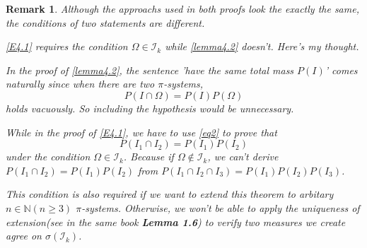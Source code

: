 \documentclass{article}
\newtheorem{remark}[theorem]{Remark}
\newcommand{\mbn}{\mathbb{N}}
\newcommand{\mci}{\mathcal{I}}
\begin{document}
\begin{remark}
    Although the approachs used in both proofs look the exactly the same, the conditions of two statements are different.
    
    \cref{E4.1} requires the condition $\Omega \in \mci_k$ while \cref{lemma4.2} doesn't. Here's my thought.
    
    In the proof of \cref{lemma4.2}, the sentence \textit{'have the same total mass $P(I)$'} comes naturally since when there are two $\pi$-systems,
    \[
        P(I \cap \Omega) = P(I)P(\Omega)
    \]
    holds vacuously. So including the hypothesis would be unnecessary.
    
    While in the proof of \cref{E4.1}, we have to use \cref{eq2} to prove that
    \[
        P(I_1 \cap I_2) = P(I_1) P(I_2)
    \]
    under the condition $\Omega \in \mci_k$. Because if $\Omega \notin \mci_k$, we can't derive $P(I_1 \cap I_2) = P(I_1) P(I_2)$ from $P(I_1 \cap I_2 \cap I_3) = P(I_1) P(I_2) P(I_3)$.
    
    This condition is also required if we want to extend this theorem to arbitary $n\in \mbn (n \geq 3)$ $\pi$-systems. Otherwise, we won't be able to apply the uniqueness of extension(see in the same book \textbf{Lemma 1.6}) to verify two measures we create agree on $\sigma(\mci_k)$.
    
\end{remark}
\end{document}

